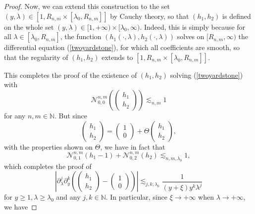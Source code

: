 \documentclass[11 pt]{amsart}
\theoremstyle{definition}
\theoremstyle{remark}
\numberwithin{equation}{section}
\begin{document}
\begin{proof}
  Now, we can extend this construction to the set $(y,\lambda)\in[1,R_{n,m}\times [\lambda_0,R_{n,m}]]$ by Cauchy theory, so that $(h_{1},h_2)$ is defined on the whole set $(y,\lambda) \in [1, + \infty )\times [\lambda_0,\infty)$. Indeed, this is simply because for all $\lambda \in [\lambda_0,R_{n,m}]$, the function $(h_1(\cdot,\lambda), h_2(\cdot,\lambda))$ solves on $[R_{n, m},\infty)$ the differential
  equation (\ref{twoyardstone}), for which all coefficients are smooth, so that the regularity of $(h_1,h_2)$ extends to $[1,R_{n,m}\times [\lambda_0,R_{n,m}]]$.
  
  This completes the proof of the existence of $(h_1, h_2)$ solving
  (\ref{twoyardstone}) with
  \[ \mathcal{N}_{0, 0}^{n, m} \left( \left(\begin{array}{c}
       h_1\\
       h_2
     \end{array}\right) \right) \lesssim_{n, m} 1 \]
  for any $n, m \in \mathbb{N}$. But since
  \[ \left(\begin{array}{c}
       h_1\\
       h_2
     \end{array}\right) = \left(\begin{array}{c}
       1\\
       0
     \end{array}\right) + \Theta \left(\begin{array}{c}
       h_1\\
       h_2
     \end{array}\right), \]
  with the properties shown on $\Theta$, we have in fact that
  \begin{equation}
    \mathcal{N}_{0, 1}^{n, m} (h_1 - 1) +\mathcal{N}_{0, 2}^{n, m} (h_2)
    \lesssim_{n, m, \lambda_0} 1, \label{ejeca}
  \end{equation}
  which completes the proof of
  \[ \left| \partial_{\lambda}^j \partial_y^k \left( \left(\begin{array}{c}
       h_1\\
       h_2
     \end{array}\right) - \left(\begin{array}{c}
       1\\
       0
     \end{array}\right) \right) \right| \lesssim_{j, k, \lambda_0} \frac{1}{(y
     + \xi) y^k \lambda^j} \]
  for $y \geqslant 1, \lambda \geqslant \lambda_0$ and any $j, k \in
  \mathbb{N}$. In particular, since $\xi \rightarrow + \infty$ when $\lambda
  \rightarrow + \infty$, we have

\end{proof}
\end{document}
